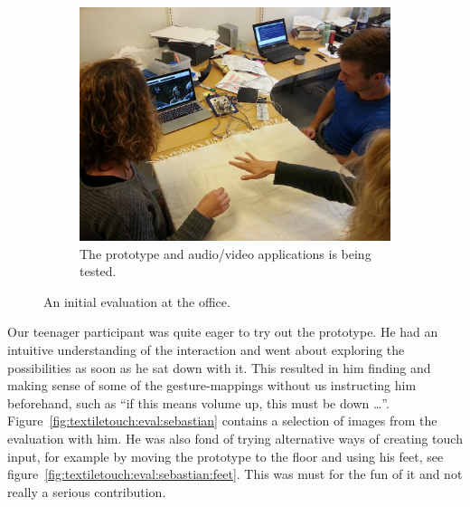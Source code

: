 \begin{figure}[t]
        \begin{subfigure}[b]{0.9\textwidth}
                \centering
                \includegraphics[width=\textwidth]{figures/touch/evaluation/kaia-gitte-troels/kaia-gitte}
                \caption{The prototype and audio/video applications is being tested.}
                \label{fig:textiletouch:eval:kaia-gitte-troels:kaia-gitte}
        \end{subfigure}
        \caption{An initial evaluation at the office.}
        \label{fig:textiletouch:eval:kaia-gitte-troels}
\end{figure}

Our teenager participant was quite eager to try out the prototype.
He had an intuitive understanding of the interaction and went about exploring the possibilities as soon as he sat down with it.
This resulted in him finding and making sense of some of the gesture-mappings without us instructing him beforehand, such as ``if this means volume up, this must be down \dots''.
Figure~\ref{fig:textiletouch:eval:sebastian} contains a selection of images from the evaluation with him.
He was also fond of trying alternative ways of creating touch input, for example by moving the prototype to the floor and using his feet, see figure~\ref{fig:textiletouch:eval:sebastian:feet}.
This was must for the fun of it and not really a serious contribution.

